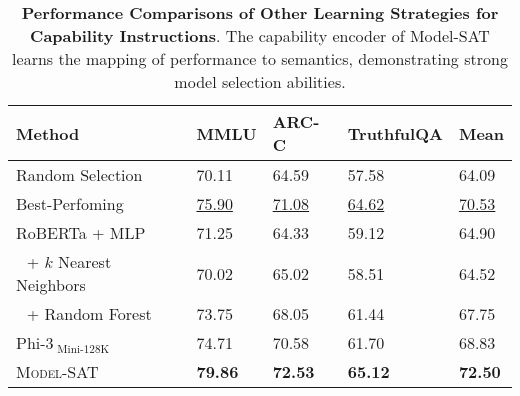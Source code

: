 
\begin{table}[t]
\small
\vspace{-6pt}
\label{tab:compared_results}
\centering
\setlength\tabcolsep{1.7pt}
\begin{tabular}{ p{2.6em} p{6.2em}<{\centering} p{3.5em}<{\centering} p{3.5em}<{\centering}  p{3.5em}<{\centering} p{3.5em}<{\centering}}
\toprule
\multicolumn{2}{l}{\textbf{Method}} & {\scriptsize \textbf{MMLU}} & {\scriptsize \textbf{ARC-C}} & {\scriptsize \textbf{TruthfulQA}} & {\scriptsize \textbf{Mean}} \\
\midrule
\multicolumn{2}{l}{Random Selection} & 70.11 & 64.59 & 57.58 & 64.09 \\
\multicolumn{2}{l}{Best-Perfoming} & \underline{75.90} & \underline{71.08} & \underline{64.62} & \underline{70.53} \\
\multicolumn{2}{l}{RoBERTa + {\scriptsize MLP}} & 71.25 & 64.33 & 59.12 & 64.90 \\
\multicolumn{2}{l}{\,\,\,\,+ {\scriptsize $k$ Nearest Neighbors}} & 70.02 & 65.02 & 58.51 & 64.52 \\
\multicolumn{2}{l}{\,\,\,\,+ {\scriptsize Random Forest}} & 73.75 & 68.05 & 61.44 & 67.75 \\
\multicolumn{2}{l}{Phi-3$_{\text{\ Mini-128K}}$} & 74.71 & 70.58 & 61.70 & 68.83 \\
\multicolumn{2}{l}{\textsc{Model-SAT}} & \textbf{79.86} & \textbf{72.53} & \textbf{65.12} & \textbf{72.50} \\
\bottomrule
\end{tabular}
\caption{\textbf{Performance Comparisons of Other Learning Strategies for Capability Instructions}. The capability encoder of Model-SAT learns the mapping of performance to semantics, demonstrating strong model selection abilities.}
\vspace{-14pt}
\end{table}